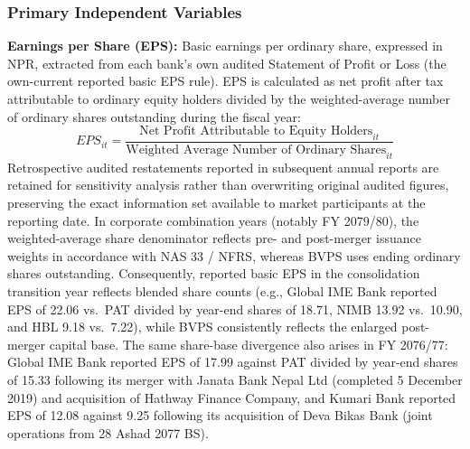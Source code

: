 \subsubsection{Primary Independent Variables}
\textbf{Earnings per Share (EPS):}
Basic earnings per ordinary share, expressed in NPR, extracted from each bank's own audited Statement of Profit or Loss (the own-current reported basic EPS rule). EPS is calculated as net profit after tax attributable to ordinary equity holders divided by the weighted-average number of ordinary shares outstanding during the fiscal year:
\begin{equation}
\mathit{EPS}_{it} = \frac{\text{Net Profit Attributable to Equity Holders}_{it}}{\text{Weighted Average Number of Ordinary Shares}_{it}}
\label{eq:eps_def}
\end{equation}
Retrospective audited restatements reported in subsequent annual reports are retained for sensitivity analysis rather than overwriting original audited figures, preserving the exact information set available to market participants at the reporting date. In corporate combination years (notably FY 2079/80), the weighted-average share denominator reflects pre- and post-merger issuance weights in accordance with NAS 33 / NFRS, whereas BVPS uses ending ordinary shares outstanding. Consequently, reported basic EPS in the consolidation transition year reflects blended share counts (e.g., Global IME Bank reported EPS of 22.06 vs.\ PAT divided by year-end shares of 18.71, NIMB 13.92 vs.\ 10.90, and HBL 9.18 vs.\ 7.22), while BVPS consistently reflects the enlarged post-merger capital base. The same share-base divergence also arises in FY 2076/77: Global IME Bank reported EPS of 17.99 against PAT divided by year-end shares of 15.33 following its merger with Janata Bank Nepal Ltd (completed 5 December 2019) and acquisition of Hathway Finance Company, and Kumari Bank reported EPS of 12.08 against 9.25 following its acquisition of Deva Bikas Bank (joint operations from 28 Ashad 2077 BS).

